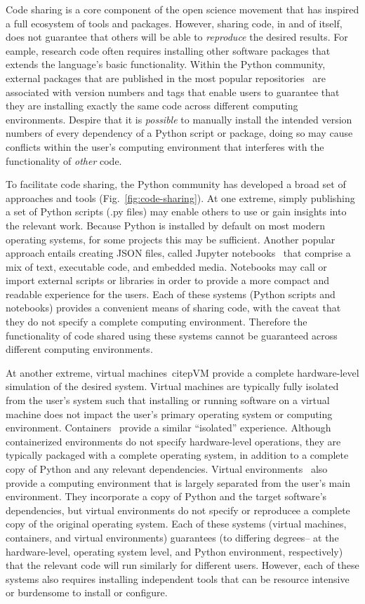 \documentclass[preprint,12pt, a4paper]{elsarticle}
\begin{document}
Code sharing is a core component of the open science movement
that has inspired a full ecosystem of tools and packages.  However,
sharing code, in and of itself, does not guarantee that others will be
able to \textit{reproduce} the desired results.  For eample, research
code often requires installing other software packages that extends
the language's basic functionality.  Within the Python community,
external packages that are published in the most popular 
repositories~\citep{PIP, CONDA} are associated with version numbers
and tags that enable users to guarantee that they are installing
exactly the same code across different computing environments.
Despire that it is \textit{possible} to manually install the intended version numbers of
every dependency of a Python script or package, doing so may cause
conflicts within the user's computing environment that interferes with
the functionality of  \textit{other} code.

To facilitate code sharing, the Python community has developed a broad
set of approaches and tools (Fig.~\ref{fig:code-sharing}).  At one
extreme, simply publishing a set of Python scripts (.py files) may
enable others to use or gain insights into the relevant work.  Because
Python is installed by default on most modern operating systems, for
some projects this may be sufficient.  Another popular approach entails
creating JSON files, called Jupyter notebooks~\citep{KluyEtal16} that
comprise a mix of text, executable code, and embedded media.
Notebooks may call or import external scripts or libraries in order to
provide a more compact and readable experience for the users.  Each of
these systems (Python scripts and notebooks) provides a convenient
means of sharing code, with the caveat that they do not specify a
complete computing environment.  Therefore the functionality of code
shared using these systems cannot be guaranteed across different
computing environments.

At another extreme, virtual machines~citep{VM} provide a complete hardware-level
simulation of the desired system.  Virtual machines are typically
fully isolated from the user's system such that installing or running
software on a virtual machine does not impact the user's primary
operating system or computing environment.  Containers~\citep[e.g.,][]{Merk14,
  SINGULARITY} provide a similar ``isolated'' experience.  Although
containerized environments do not specify hardware-level operations,
they are typically packaged with a complete operating system, in
addition to a complete copy of Python and any relevant dependencies.
Virtual environments~\citep[e.g.,][]{vanRoEtal14} also provide a
computing environment that is largely separated from the user's main
environment.  They incorporate a copy of Python and the target
software's dependencies, but virtual environments do not specify or
reproducee a complete copy of the original operating system.  Each of
these systems (virtual machines, containers, and virtual environments)
guarantees (to differing degrees-- at the hardware-level, operating system
level, and Python environment, respectively) that the relevant code
will run similarly for different users.  However, each of these
systems also requires installing independent tools that
can be resource intensive or burdensome to install or configure.
\end{document}
